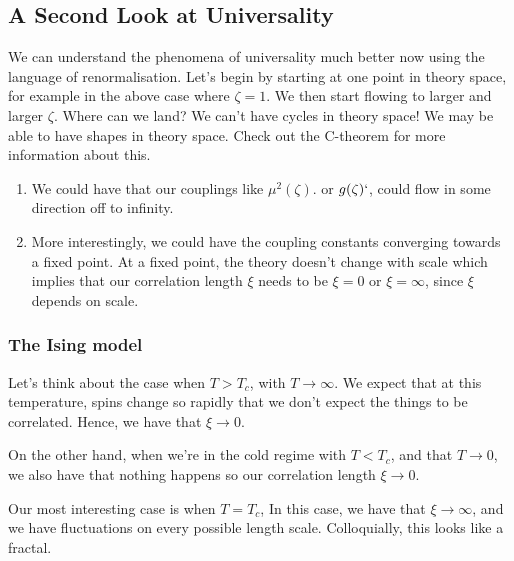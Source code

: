 \subsection{A Second Look at Universality} 
We can understand the phenomena of universality 
much better now using the language of renormalisation. 
Let's begin by starting at one point in theory space, for example 
in the above case where $ \zeta = 1 $. 
We then start flowing to larger and larger $ \zeta $. 
Where can we land? 
We can't have cycles in theory space! We may be able to have 
shapes in theory space. 
Check out the C-theorem for more information about this. 
\begin{enumerate}
	\item We could have that our couplings like $ \mu^ 2 ( \zeta ) $. or $ g ( \zeta) `$, 
		could flow in some direction off to infinity. 
	\item More interestingly, we could have the coupling constants 
		converging towards a fixed point. At a fixed point, 
		the theory doesn't change with scale which implies that our correlation 
		length  $ \xi $ needs to be $ \xi = 0 $ or  $ \xi = \infty$, 
		since $ \xi $ depends on scale. 
\end{enumerate}

\subsubsection{The Ising model} 
Let's think about the case when $ T > T_c$, with $ 
T \to \infty$. We expect that at this temperature, 
spins change so rapidly that we don't expect the things to 
be correlated. Hence, we have that $ \xi \to 0$. 

On the other hand, when we're in the cold regime
with  $ T < T_ c $, and that  $ T \to 0 $, we also 
have that nothing happens so our correlation length 
$ \xi \to 0 $. 

Our most interesting case is when  $ T = T_c $, 
In this case, we have that  $ \xi \to \infty$, 
and we have fluctuations on every possible length scale. 
Colloquially, this looks like a fractal. 

